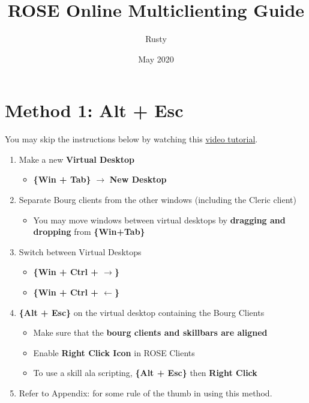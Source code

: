 \documentclass{article}
\title{ROSE Online Multiclienting Guide}
\author{Rusty}
\date{May 2020}
\begin{document}
\maketitle

\section{Method 1: Alt + Esc}
\label{section: method1}

You may skip the instructions below by watching this \href{https://www.youtube.com/watch?v=Loo_phNvK50}{video tutorial}.

\begin{enumerate}
   \item Make a new \textbf{Virtual Desktop}
   \begin{itemize}
     \item \textbf{\{Win + Tab\}} $\rightarrow$ \textbf{New Desktop}
   \end{itemize}
   \item Separate Bourg clients from the other windows (including the Cleric client)
   \begin{itemize}
     \item You may move windows between virtual desktops by \textbf{dragging and dropping} from \textbf{\{Win+Tab\}}
   \end{itemize}
   \item Switch between Virtual Desktops
   \begin{itemize}
     \item \textbf{\{Win + Ctrl + $\rightarrow$\}}
     \item \textbf{\{Win + Ctrl + $\leftarrow$\}}
   \end{itemize}
   \item \textbf{\{Alt + Esc\}} on the virtual desktop containing the Bourg Clients
   \begin{itemize}
     \item Make sure that the \textbf{bourg clients and skillbars are aligned}
     \item Enable \textbf{Right Click Icon} in ROSE Clients
     \item To use a skill ala scripting, \textbf{\{Alt + Esc\}} then \textbf{Right Click }
   \end{itemize}
   \item Refer to Appendix:  for some rule of the thumb in using this method.
 
\end{enumerate}
\end{document}
